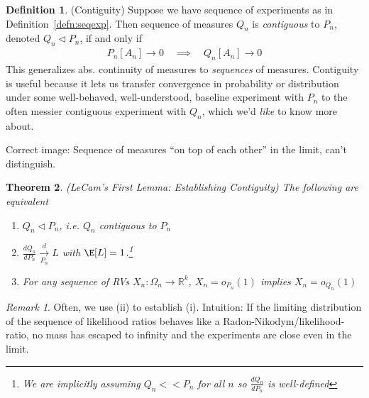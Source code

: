 \documentclass[12pt]{article}
\theoremstyle{plain}
\newtheorem{thm}{Theorem}[section]
\theoremstyle{definition}
\newtheorem{defn}[thm]{Definition}
\theoremstyle{remark}
\newtheorem*{rmk}{Remark}
\newcommand{\ra}{\rightarrow}
\newcommand{\Rk}{\mathbb{R}^k}
\newcommand{\dto}{\xrightarrow{d}}
\begin{document}
\begin{defn}(Contiguity)
Suppose we have sequence of experiments as in
Definition~\ref{defn:seqexp}.
Then sequence of measures $Q_n$ is \emph{contiguous} to $P_n$, denoted
$Q_n \vartriangleleft P_n$, if and only if
\begin{align*}
  P_n[A_n]\ra 0
  \quad\implies\quad
  Q_n[A_n]\ra 0
\end{align*}
This generalizes abs. continuity of measures to \emph{sequences} of
measures.
Contiguity is useful because it lets us transfer convergence in
probability or distribution under some well-behaved, well-understood,
baseline experiment with $P_n$ to the often messier contiguous
experiment with $Q_n$, which we'd \emph{like} to know more about.

Correct image: Sequence of measures ``on top of each other'' in the
limit, can't distinguish.
\end{defn}

\begin{thm}\emph{(LeCam's First Lemma: Establishing Contiguity)}
\label{thm:lecams1st}
The following are equivalent
\begin{enumerate}[label=\emph{(\roman*)}]
  \item $Q_n \vartriangleleft P_n$, i.e. $Q_n$ contiguous to $P_n$
  \item $\frac{dQ_n}{dP_n}\underset{P_n}{\dto} L$ with
    $\E[L]=1$.\footnote{%
      We are implicitly assuming $Q_n<<P_n$ for all $n$ so
      $\frac{dQ_n}{dP_n}$ is well-defined
    }
  \item For any sequence of RVs $X_n:\Omega_n\ra\Rk$,
    $X_n = o_{P_n}(1)$
    implies
    $X_n = o_{Q_n}(1)$
\end{enumerate}
\end{thm}
\begin{rmk}
Often, we use (ii) to establish (i).
Intuition: If the limiting distribution of the sequence of likelihood
ratios behaves like a Radon-Nikodym/likelihood-ratio, no mass has
escaped to infinity and the experiments are close even in the limit.
\end{rmk}
\end{document}
